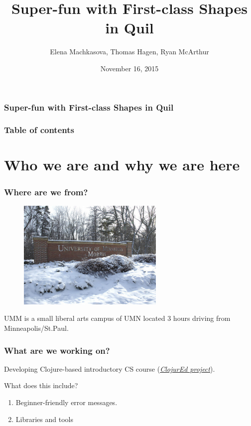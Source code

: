 \documentclass{beamer}
\begin{document}
\author{Elena Machkasova, Thomas Hagen, Ryan McArthur}
\title{Super-fun with First-class Shapes in Quil}
\date{November 16, 2015}

\begin{frame}
\frametitle {Super-fun with First-class Shapes in Quil}
\maketitle
\end{frame}

\begin{frame}
\frametitle{Table of contents}
\tableofcontents  
\end{frame}

\section{Who we are and why we are here}

\begin{frame}
\frametitle{Where are we from?}
\begin{figure}[h]
\includegraphics[width=7cm]{PresentationImages/umm-winter.jpg}
\end{figure}
UMM is a small liberal arts campus of UMN located 3 hours driving from Minneapolis/St.Paul. 
\end{frame}

\begin{frame}
\frametitle{What are we working on?}
Developing Clojure-based introductory CS course ({\it \href{http://cda.morris.umn.edu/~elenam/\#clojure}{ClojurEd project}}). 

What does this include? 
\begin{enumerate}
\item Beginner-friendly error messages. 
\item Libraries and tools 
\end{enumerate}
\end{frame}
\end{document}
